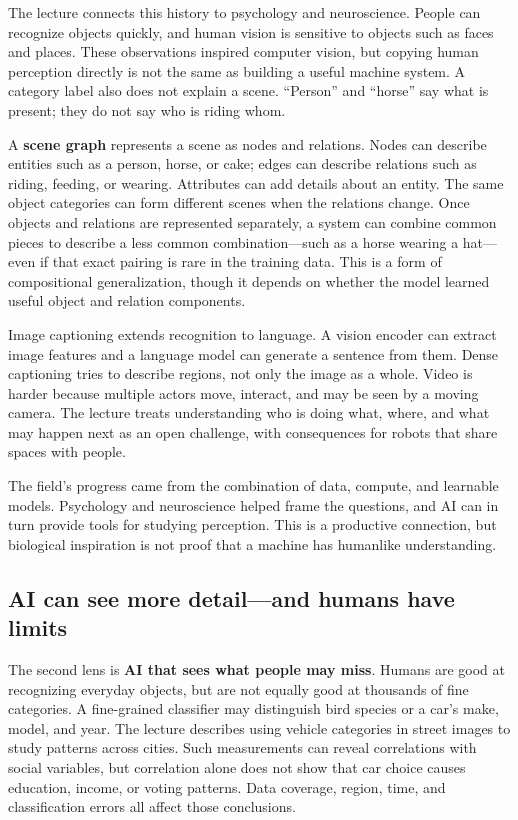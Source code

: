 The lecture connects this history to psychology and neuroscience. People can recognize objects quickly, and human vision is sensitive to objects such as faces and places. These observations inspired computer vision, but copying human perception directly is not the same as building a useful machine system. A category label also does not explain a scene. ``Person'' and ``horse'' say what is present; they do not say who is riding whom.

A \textbf{scene graph} represents a scene as nodes and relations. Nodes can describe entities such as a person, horse, or cake; edges can describe relations such as riding, feeding, or wearing. Attributes can add details about an entity. The same object categories can form different scenes when the relations change. Once objects and relations are represented separately, a system can combine common pieces to describe a less common combination---such as a horse wearing a hat---even if that exact pairing is rare in the training data. This is a form of compositional generalization, though it depends on whether the model learned useful object and relation components.

Image captioning extends recognition to language. A vision encoder can extract image features and a language model can generate a sentence from them. Dense captioning tries to describe regions, not only the image as a whole. Video is harder because multiple actors move, interact, and may be seen by a moving camera. The lecture treats understanding who is doing what, where, and what may happen next as an open challenge, with consequences for robots that share spaces with people.

The field's progress came from the combination of data, compute, and learnable models. Psychology and neuroscience helped frame the questions, and AI can in turn provide tools for studying perception. This is a productive connection, but biological inspiration is not proof that a machine has humanlike understanding.

\subsection{AI can see more detail---and humans have limits}\label{04-visual-computing-ii-ch034-ai-can-see-more-detailand-humans-have-limits}

The second lens is \textbf{AI that sees what people may miss}. Humans are good at recognizing everyday objects, but are not equally good at thousands of fine categories. A fine-grained classifier may distinguish bird species or a car's make, model, and year. The lecture describes using vehicle categories in street images to study patterns across cities. Such measurements can reveal correlations with social variables, but correlation alone does not show that car choice causes education, income, or voting patterns. Data coverage, region, time, and classification errors all affect those conclusions.

